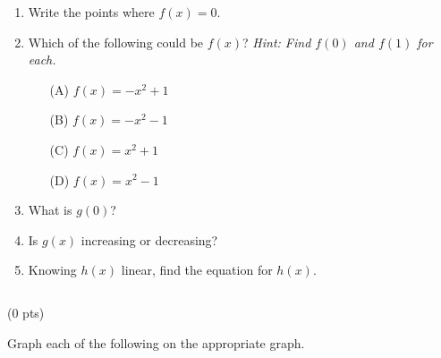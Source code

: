 \documentclass{ximera}
\begin{document}
    \begin{enumerate}[label=(\alph*)]
        \item Write the points where $f(x)=0$. \vspace{1cm}
        \item\makebox[0pt][r]{(1 pt) \hspace{0.65cm}} Which of the following could be $f(x)$? \textit{Hint: Find $f(0)$ and $f(1)$ for each.} 
        \begin{enumerate}
            \item[(A)] $f(x)=-x^2+1$
            \item[(B)] $f(x)=-x^2-1$
            \item[(C)] $f(x)=x^2+1$
            \item[(D)] $f(x)=x^2-1$
        \end{enumerate}
        \item What is $g(0)$? \vspace{3cm}
        \item\makebox[0pt][r]{(1 pt) \hspace{0.65cm}} Is $g(x)$ increasing or decreasing? \vspace{1cm}
        \item Knowing $h(x)$ linear, find the equation for $h(x)$.  
    \end{enumerate}

\newpage $\,$
\newpage


 (0 pts)

Graph each of the following on the appropriate graph.
\end{document}
